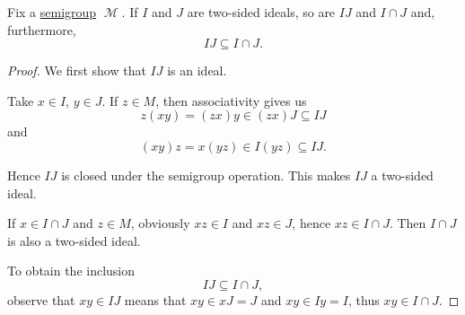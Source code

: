 \begin{proposition}\label{thm:product_of_semigroup_ideals_is_in_intersection}
  Fix a \hyperref[def:magma/associative]{semigroup} \( \mscrM \). If \( I \) and \( J \) are two-sided ideals, so are \( IJ \) and \( I \cap J \) and, furthermore,
  \begin{equation*}
    IJ \subseteq I \cap J.
  \end{equation*}
\end{proposition}
\begin{proof}
  We first show that \( IJ \) is an ideal.

  Take \( x \in I \), \( y \in J \). If \( z \in M \), then associativity gives us
  \begin{equation*}
    z(xy) = (zx)y \in (zx)J \subseteq IJ
  \end{equation*}
  and
  \begin{equation*}
    (xy)z = x(yz) \in I(yz) \subseteq IJ.
  \end{equation*}

  Hence \( IJ \) is closed under the semigroup operation. This makes \( IJ \) a two-sided ideal.

  If \( x \in I \cap J \) and \( z \in M \), obviously \( xz \in I \) and \( xz \in J \), hence \( xz \in I \cap J \). Then \( I \cap J \) is also a two-sided ideal.

  To obtain the inclusion
  \begin{equation*}
    IJ \subseteq I \cap J,
  \end{equation*}
  observe that \( xy \in IJ \) means that \( xy \in xJ = J \) and \( xy \in Iy = I \), thus \( xy \in I \cap J \).
\end{proof}
